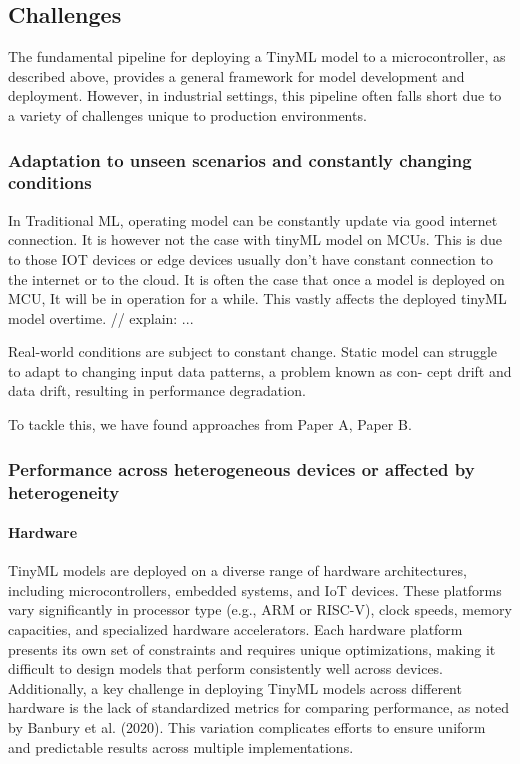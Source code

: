 \documentclass[twocolumn]{article}
\begin{document}
\subsection{Challenges}

The fundamental pipeline for deploying a TinyML model to a microcontroller, as described above, provides a general framework for model development and deployment. However, in industrial settings, this pipeline often falls short due to a variety of challenges unique to production environments.

\subsubsection{Adaptation to unseen scenarios and constantly changing conditions}
In Traditional ML, operating model can be constantly update via good internet connection. It is however not the case with tinyML model on MCUs. This is due to those IOT devices or edge devices usually don't have constant connection to the internet or to the cloud. It is often the case that once a model is deployed on MCU, It will be in operation for a while.
This vastly affects the deployed tinyML model overtime. // explain: ... 

Real-world conditions are subject to constant change. Static model can struggle to adapt to changing input data patterns, a problem known as con- cept drift and data drift, resulting in performance degradation.

To tackle this, we have found approaches from Paper A, Paper B.

\subsubsection{Performance across heterogeneous devices or affected by heterogeneity}

\paragraph{Hardware} TinyML models are deployed on a diverse range of hardware architectures, including microcontrollers, embedded systems, and IoT devices. These platforms vary significantly in processor type (e.g., ARM or RISC-V), clock speeds, memory capacities, and specialized hardware accelerators. Each hardware platform presents its own set of constraints and requires unique optimizations, making it difficult to design models that perform consistently well across devices. Additionally, a key challenge in deploying TinyML models across different hardware is the lack of standardized metrics for comparing performance, as noted by Banbury et al. (2020). This variation complicates efforts to ensure uniform and predictable results across multiple implementations.
\end{document}
